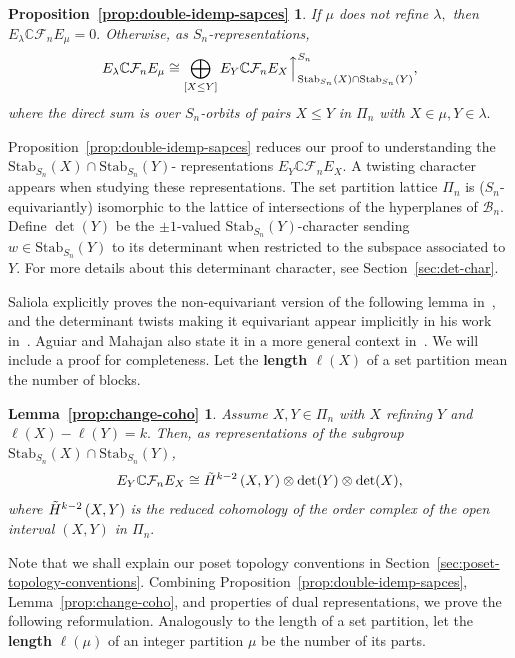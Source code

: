 \documentclass[ALCO, Unicode]{cedram}
\def\C{{\mathbb{C}}}
\def\stab{\mathrm{Stab}}
\begin{document}
\newtheorem*{prop:double-idemp-sapces}{Proposition~\ref{prop:double-idemp-sapces}}
\begin{prop:double-idemp-sapces}
If $\mu$ does not refine $\lambda,$ then $E_\lambda \C \mathcal{F}_n E_\mu = 0.$ Otherwise, as $S_n$-representations,
    \begin{align*}
        E_{\lambda}\C \mathcal{F}_nE_{\mu} \cong \bigoplus_{ [X \leq Y]} E_Y \C \mathcal{F}_n E_X\Big\uparrow_{\stab_{S_n}(X) \cap \stab_{S_n}(Y)}^{S_n},
    \end{align*}
     where the direct sum is over $S_n$-orbits of pairs $X \leq Y$ in $\Pi_n$ with $X \in \mu, Y \in \lambda.$
\end{prop:double-idemp-sapces}
Proposition~\ref{prop:double-idemp-sapces} reduces our proof to understanding the $\stab_{S_n}(X) \cap \stab_{S_n}(Y)$- representations $E_Y \C \mathcal{F}_n E_X.$ A twisting character appears when studying these representations. The set partition lattice $\Pi_n$ is ($S_n$-equivariantly) isomorphic to the  lattice of intersections of the hyperplanes of $\mathcal{B}_n$.  Define \textbf{$\det(Y)$} be the $\pm 1$-valued $\stab_{S_n}(Y)$-character sending $w \in \stab_{S_n}(Y)$ to its determinant when restricted to the subspace associated to $Y.$  For more details about this determinant character, see Section~\ref{sec:det-char}.

Saliola explicitly proves the non-equivariant version of the following lemma in~\cite[\S 10.2]{saliolafacealgebra}, and the  determinant twists making it equivariant appear implicitly in his work in~\cite[Theorem 6.2]{saliolaquiverdescalgebra}. Aguiar and Mahajan also state it in a more general context in~\cite[Proposition 14.44]{Aguiar-Mahajan}. We will include a proof for completeness. Let the \textbf{length $\ell(X)$} of a set partition mean the number of blocks.

\newtheorem*{prop:change-coho}{Lemma~\ref{prop:change-coho}}
\begin{prop:change-coho}
  Assume $X, Y \in \Pi_n$ with $X$ refining $Y$ and $\ell(X) - \ell(Y) = k.$ Then, as representations of the subgroup $\stab_{S_n}(X) \cap \stab_{S_n}(Y)$, 
    \[E_Y \C \mathcal{F}_n E_X \cong \Tilde{H}^{k - 2}\left(X, Y\right) \otimes \det(Y) \otimes \det(X),\] where $\Tilde{H}^{k - 2}\left(X, Y\right)$ is the reduced cohomology of the order complex of the open interval $(X, Y)$ in $\Pi_n.$  
\end{prop:change-coho}
Note that we shall explain our poset topology conventions in Section~\ref{sec:poset-topology-conventions}. Combining Proposition~\ref{prop:double-idemp-sapces}, Lemma~\ref{prop:change-coho}, and properties of dual representations, we prove the following reformulation. Analogously to the length of a set partition, let the \textbf{length} \textbf{$\ell(\mu)$} of an integer partition $\mu$ be the number of its parts.
\end{document}
